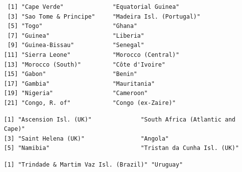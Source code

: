 \documentclass[
  letterpaper,
  oneside,
  open=any]{scrbook}
\newenvironment{Shaded}{\begin{snugshade}}{\end{snugshade}}
\newcommand{\CommentTok}[1]{\textcolor[rgb]{0.37,0.37,0.37}{#1}}
\newcommand{\FunctionTok}[1]{\textcolor[rgb]{0.28,0.35,0.67}{#1}}
\newcommand{\NormalTok}[1]{\textcolor[rgb]{0.00,0.23,0.31}{#1}}
\newcommand{\SpecialCharTok}[1]{\textcolor[rgb]{0.37,0.37,0.37}{#1}}
\newcommand{\StringTok}[1]{\textcolor[rgb]{0.13,0.47,0.30}{#1}}
\begin{document}
\begin{verbatim}
 [1] "Cape Verde"              "Equatorial Guinea"      
 [3] "Sao Tome & Principe"     "Madeira Isl. (Portugal)"
 [5] "Togo"                    "Ghana"                  
 [7] "Guinea"                  "Liberia"                
 [9] "Guinea-Bissau"           "Senegal"                
[11] "Sierra Leone"            "Morocco (Central)"      
[13] "Morocco (South)"         "Côte d'Ivoire"          
[15] "Gabon"                   "Benin"                  
[17] "Gambia"                  "Mauritania"             
[19] "Nigeria"                 "Cameroon"               
[21] "Congo, R. of"            "Congo (ex-Zaire)"       
\end{verbatim}

\begin{Shaded}
\end{Shaded}

\begin{verbatim}
[1] "Ascension Isl. (UK)"              "South Africa (Atlantic and Cape)"
[3] "Saint Helena (UK)"                "Angola"                          
[5] "Namibia"                          "Tristan da Cunha Isl. (UK)"      
\end{verbatim}

\begin{Shaded}
\end{Shaded}

\begin{verbatim}
[1] "Trindade & Martim Vaz Isl. (Brazil)" "Uruguay"                            
\end{verbatim}

\begin{Shaded}
\end{Shaded}
\end{document}
